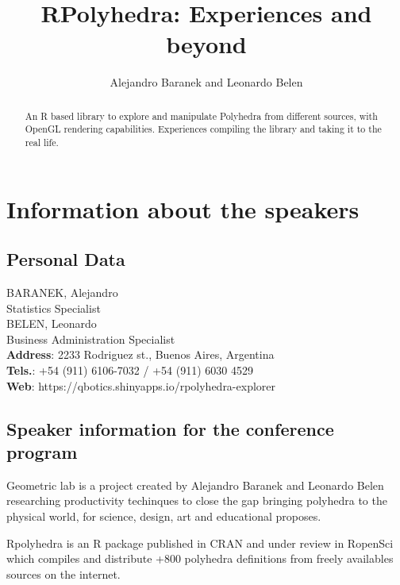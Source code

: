 \documentclass[a4paper,10pt]{article}
\title{RPolyhedra: Experiences and beyond}
\author{Alejandro Baranek and Leonardo Belen}
\begin{document}
\maketitle
\thispagestyle{Title} 


\begin{abstract}
An R based library to explore and manipulate Polyhedra from different sources, with OpenGL rendering capabilities. Experiences compiling the library and taking it to the real life.  
\end{abstract}


\section{Information about the speakers}

\subsection{Personal Data}
BARANEK, Alejandro \\
Statistics Specialist \\
BELEN, Leonardo \\
Business Administration Specialist \\

\textbf{Address}: 2233 Rodriguez st., Buenos Aires, Argentina \\
\textbf{Tels.}: +54 (911) 6106-7032 / +54 (911) 6030 4529\\
\textbf{Web}: https://qbotics.shinyapps.io/rpolyhedra-explorer \\



\subsection{Speaker information for the conference program}



Geometric lab is a project created by Alejandro Baranek and Leonardo Belen researching productivity techinques to close the gap bringing polyhedra to the physical world, for science, design, art and educational proposes.


Rpolyhedra is an R package published in CRAN and under review in RopenSci which compiles and distribute +800 polyhedra definitions from freely availables sources on the internet.
\end{document}
